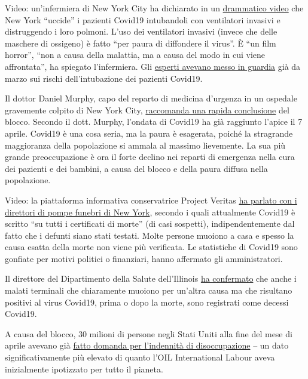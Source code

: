 Video: un'infermiera di New York City ha dichiarato in un
\href{https://www.dailymail.co.uk/news/article-8262351/Nurse-New-York-claims-city-killing-COVID-19-patients-putting-ventilators.html}{drammatico
video} che New York ``uccide'' i pazienti Covid19 intubandoli con
ventilatori invasivi e distruggendo i loro polmoni. L'uso dei
ventilatori invasivi (invece che delle maschere di ossigeno) è fatto
``per paura di diffondere il virus''. È ``un film horror'', ``non a
causa della malattia, ma a causa del modo in cui viene affrontata'', ha
spiegato l'infermiera. Gli
\href{https://off-guardian.org/2020/05/06/covid19-are-ventilators-killing-people/}{esperti
avevano messo in guardia} già da marzo sui rischi dell'intubazione dei
pazienti Covid19.

Il dottor Daniel Murphy, capo del reparto di medicina d'urgenza in un
ospedale gravemente colpito di New York City,
\href{https://nypost.com/2020/04/27/ive-worked-the-coronavirus-front-line-and-i-say-its-time-to-start-opening-up/}{raccomanda
una rapida conclusione} del blocco. Secondo il dott. Murphy, l'ondata di
Covid19 ha già raggiunto l'apice il 7 aprile. Covid19 è una cosa seria,
ma la paura è esagerata, poiché la stragrande maggioranza della
popolazione si ammala al massimo lievemente. La sua più grande
preoccupazione è ora il forte declino nei reparti di emergenza nella
cura dei pazienti e dei bambini, a causa del blocco e della paura
diffusa nella popolazione.

Video: la piattaforma informativa conservatrice Project Veritas
\href{https://www.youtube.com/watch?v=g5f_6ltv7oI}{ha parlato con i
direttori di pompe funebri di New York}, secondo i quali attualmente
Covid19 è scritto ``su tutti i certificati di morte'' (di casi
sospetti), indipendentemente dal fatto che i defunti siano stati
testati. Molte persone muoiono a casa e spesso la causa esatta della
morte non viene più verificata. Le statistiche di Covid19 sono gonfiate
per motivi politici o finanziari, hanno affermato gli amministratori.

Il direttore del Dipartimento della Salute dell'Illinois
\href{https://week.com/2020/04/20/idph-director-explains-how-covid-deaths-are-classified/}{ha
confermato} che anche i malati terminali che chiaramente muoiono per
un'altra causa ma che risultano positivi al virus Covid19, prima o dopo
la morte, sono registrati come decessi Covid19.

A causa del blocco, 30 milioni di persone negli Stati Uniti alla fine
del mese di aprile avevano già
\href{https://edition.cnn.com/2020/04/30/economy/unemployment-benefits-coronavirus/index.html}{fatto
domanda per l'indennità di disoccupazione} -- un dato significativamente
più elevato di quanto l'OIL International Labour aveva inizialmente
ipotizzato per tutto il pianeta.

